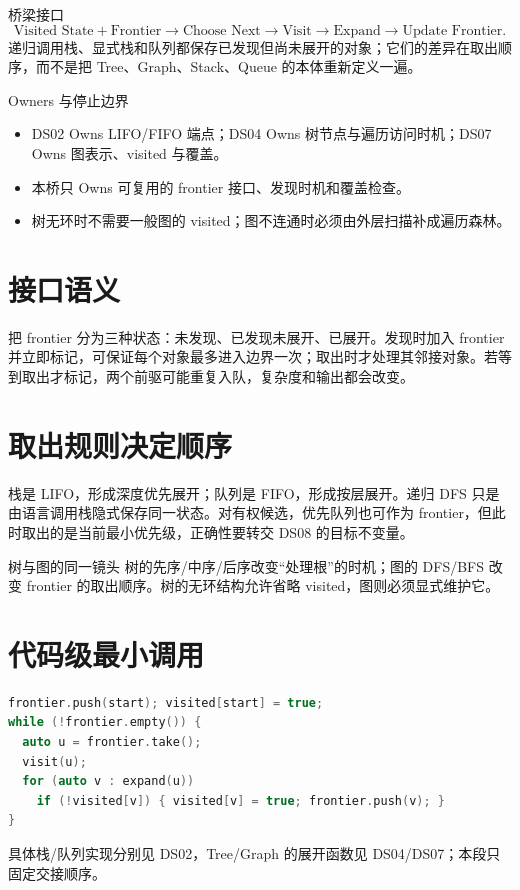 \documentclass[UTF8,fontset=none,11pt,a4paper]{ctexart}
\begin{document}

\begin{corebox}{桥梁接口}
\[
\text{Visited State}+\text{Frontier}\to\text{Choose Next}\to\text{Visit}\to\text{Expand}\to\text{Update Frontier}.
\]
递归调用栈、显式栈和队列都保存已发现但尚未展开的对象；它们的差异在取出顺序，而不是把 Tree、Graph、Stack、Queue 的本体重新定义一遍。
\end{corebox}
\begin{methodbox}{Owners 与停止边界}
\begin{itemize}
\item DS02 Owns LIFO/FIFO 端点；DS04 Owns 树节点与遍历访问时机；DS07 Owns 图表示、visited 与覆盖。
\item 本桥只 Owns 可复用的 frontier 接口、发现时机和覆盖检查。
\item 树无环时不需要一般图的 visited；图不连通时必须由外层扫描补成遍历森林。
\end{itemize}
\end{methodbox}
\tableofcontents\newpage

\section{接口语义}
把 frontier 分为三种状态：未发现、已发现未展开、已展开。发现时加入 frontier 并立即标记，可保证每个对象最多进入边界一次；取出时才处理其邻接对象。若等到取出才标记，两个前驱可能重复入队，复杂度和输出都会改变。

\section{取出规则决定顺序}
栈是 LIFO，形成深度优先展开；队列是 FIFO，形成按层展开。递归 DFS 只是由语言调用栈隐式保存同一状态。对有权候选，优先队列也可作为 frontier，但此时取出的是当前最小优先级，正确性要转交 DS08 的目标不变量。
\begin{examplebox}{树与图的同一镜头}
树的先序/中序/后序改变“处理根”的时机；图的 DFS/BFS 改变 frontier 的取出顺序。树的无环结构允许省略 visited，图则必须显式维护它。
\end{examplebox}

\section{代码级最小调用}
\begin{lstlisting}[language=C++]
frontier.push(start); visited[start] = true;
while (!frontier.empty()) {
  auto u = frontier.take();
  visit(u);
  for (auto v : expand(u))
    if (!visited[v]) { visited[v] = true; frontier.push(v); }
}
\end{lstlisting}
具体栈/队列实现分别见 DS02，Tree/Graph 的展开函数见 DS04/DS07；本段只固定交接顺序。
\end{document}
